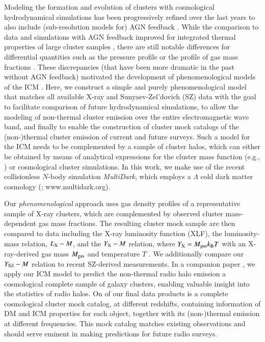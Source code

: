\documentclass[useAMS,usenatbib]{mn2e}
\begin{document}
{Modeling the formation and evolution of clusters with cosmological
hydrodynamical simulations has been progressively refined over the last years to
also include (sub-resolution models for) AGN feedback
\citep[e.g.,][]{2007MNRAS.380..877S, 2008MNRAS.387.1403S, 2008ApJ...687L..53P,
  2012MNRAS.420.2662D, 2012MNRAS.424..190G, 2013MNRAS.428.2366V}. While the
comparison to data and simulations with AGN feedback improved for integrated
thermal properties of large cluster samples
\citep{2012ApJ...758...74B,2012ApJ...758...75B}, there are still notable
differences for differential quantities such as the pressure profile
\citep{2013A&A...550A.131P} or the profile of gas mass fractions
\citep{2012arXiv1209.4082B}. These discrepancies (that have been more dramatic
in the past without AGN feedback) motivated the development of phenomenological
models of the ICM \citep[e.g.,][]{2005ApJ...634..964O,
  2012MNRAS.422..686C}. Here, we construct a simple and purely phenomenological
model that matches all available X-ray and Sunyaev-Zel'dovich (SZ) data with the
goal to facilitate comparison of future hydrodynamical simulations, to allow the
modeling of non-thermal cluster emission over the entire electromagnetic wave
band, and finally to enable the construction of cluster mock catalogs of the
(non-)thermal cluster emission of current and future surveys. Such a model for
the ICM needs to be complemented by a sample of cluster halos, which can either
be obtained by means of analytical expressions for the cluster mass function
(e.g., \citealp{2001MNRAS.321..372J}) or cosmological cluster simulations. In
this work, we make use of the recent collisionless $N$-body simulation {\em
  MultiDark}, which employs a $\Lambda$ cold dark matter cosmology
(\citealp{2011arXiv1104.5130P}; www.multidark.org).

Our \emph{phenomenological} approach uses gas density profiles of a
representative sample of X-ray clusters, which are complemented by observed
cluster mass-dependent gas mass fractions. The resulting cluster mock sample are
then compared to data including the X-ray luminosity function (XLF), the
luminosity-mass relation, $L_{{\mathrm{X}}}- M$, and the $Y_{{\mathrm{X}}}-M$ relation,
where $Y_{{\mathrm{X}}}=M_{\mathrm{gas}}k_{{\mathrm{B}}}T$ with an X-ray-derived gas mass
$M_{{\mathrm{gas}}}$ and temperature $T$ \citep{2006ApJ...650..128K}. We additionally
compare our $Y_{{\mathrm{SZ}}}-M$ relation to recent SZ-derived measurements.  In a
companion paper \citep{paper2}, we apply our ICM model to predict the
non-thermal radio halo emission a cosmological complete sample of galaxy
clusters, enabling valuable insight into the statistics of radio halos.  On of
our final data products is a complete cosmological cluster mock catalog, at
different redshifts, containing information of DM and ICM properties for each
object, together with its (non-)thermal emission at different frequencies. This
mock catalog matches existing observations and should serve eminent in making
predictions for future radio surveys.

}
\end{document}
